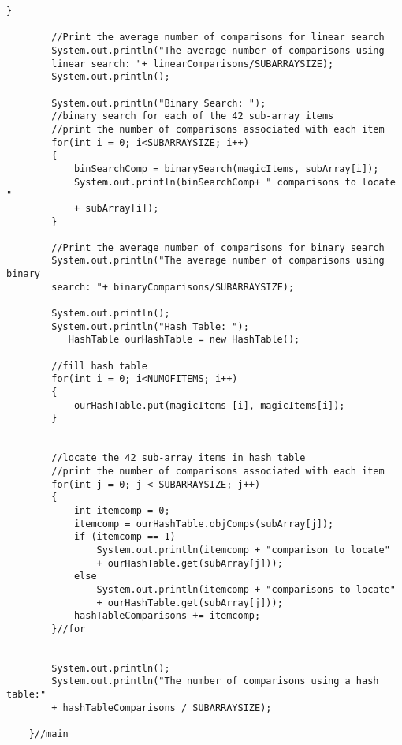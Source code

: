 \documentclass{article}
\begin{document}
\begin{lstlisting}[frame =single,
backgroundcolor = \color{grey!12}]
		}
		
		//Print the average number of comparisons for linear search
		System.out.println("The average number of comparisons using 
		linear search: "+ linearComparisons/SUBARRAYSIZE);
		System.out.println();
		
		System.out.println("Binary Search: ");
		//binary search for each of the 42 sub-array items
		//print the number of comparisons associated with each item
		for(int i = 0; i<SUBARRAYSIZE; i++)
		{
			binSearchComp = binarySearch(magicItems, subArray[i]);
			System.out.println(binSearchComp+ " comparisons to locate " 
			+ subArray[i]);	
		}
		
		//Print the average number of comparisons for binary search
		System.out.println("The average number of comparisons using binary
		search: "+ binaryComparisons/SUBARRAYSIZE);
		
		System.out.println();
		System.out.println("Hash Table: ");
           HashTable ourHashTable = new HashTable();
		
		//fill hash table
		for(int i = 0; i<NUMOFITEMS; i++)
		{
		   	ourHashTable.put(magicItems [i], magicItems[i]);
		}
		
		
		//locate the 42 sub-array items in hash table
		//print the number of comparisons associated with each item
		for(int j = 0; j < SUBARRAYSIZE; j++)
		{
			int itemcomp = 0; 
			itemcomp = ourHashTable.objComps(subArray[j]);
			if (itemcomp == 1)
				System.out.println(itemcomp + "comparison to locate" 
				+ ourHashTable.get(subArray[j]));
			else
				System.out.println(itemcomp + "comparisons to locate" 
				+ ourHashTable.get(subArray[j]));
			hashTableComparisons += itemcomp;
		}//for
		
		
		System.out.println();
		System.out.println("The number of comparisons using a hash table:"
		+ hashTableComparisons / SUBARRAYSIZE);
		
	}//main
\end{lstlisting}
\large
\end{document}
